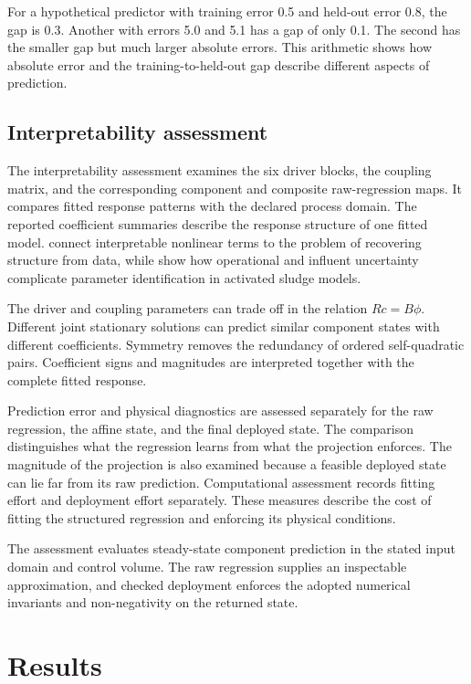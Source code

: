 For a hypothetical predictor with training error 0.5 and held-out error 0.8, the gap is 0.3. Another with errors 5.0 and 5.1 has a gap of only 0.1. The second has the smaller gap but much larger absolute errors. This arithmetic shows how absolute error and the training-to-held-out gap describe different aspects of prediction.

\subsection{Interpretability assessment}

The interpretability assessment examines the six driver blocks, the coupling matrix, and the corresponding component and composite raw-regression maps. It compares fitted response patterns with the declared process domain. The reported coefficient summaries describe the response structure of one fitted model. \citet{Brunton2016} connect interpretable nonlinear terms to the problem of recovering structure from data, while \citet{Machado2014} show how operational and influent uncertainty complicate parameter identification in activated sludge models.

The driver and coupling parameters can trade off in the relation \(Rc=B\phi\). Different joint stationary solutions can predict similar component states with different coefficients. Symmetry removes the redundancy of ordered self-quadratic pairs. Coefficient signs and magnitudes are interpreted together with the complete fitted response.

Prediction error and physical diagnostics are assessed separately for the raw regression, the affine state, and the final deployed state. The comparison distinguishes what the regression learns from what the projection enforces. The magnitude of the projection is also examined because a feasible deployed state can lie far from its raw prediction. Computational assessment records fitting effort and deployment effort separately. These measures describe the cost of fitting the structured regression and enforcing its physical conditions.

The assessment evaluates steady-state component prediction in the stated input domain and control volume. The raw regression supplies an inspectable approximation, and checked deployment enforces the adopted numerical invariants and non-negativity on the returned state.

\section{Results}
\label{sec:icsor_results}

